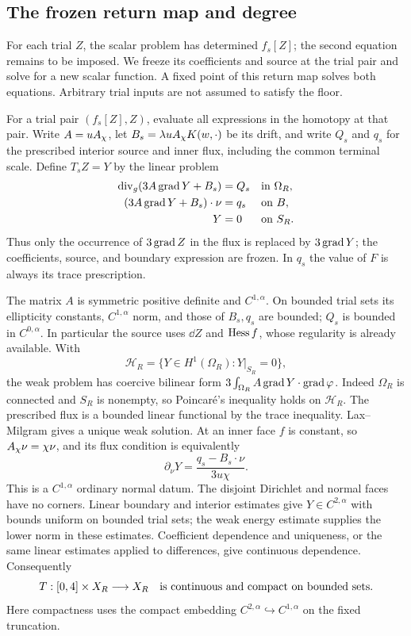 \subsection{The frozen return map and degree}

For each trial $Z$, the scalar problem has determined $f_s[Z]$;
the second equation remains to be imposed. We freeze its
coefficients and source at the trial pair and solve for a new
scalar function. A fixed point of this return map solves both
equations. Arbitrary trial inputs are not assumed to satisfy the floor.

For a trial pair $(f_s[Z],Z)$, evaluate all expressions in the
homotopy at that pair.  Write $A=uA_\chi$, let
$B_s=\lambda uA_\chi K(w,\cdot)$ be its drift, and write $Q_s$ and $q_s$
for the prescribed interior source and inner flux, including the
common terminal scale.  Define $T_sZ=Y$ by the linear problem
\begin{equation}\label{four:ex:frozen-problem}
 \begin{aligned}
 \operatorname{div}_g(3A\operatorname{grad} Y+B_s)&=Q_s &&\hbox{in }\Omega_R,\\
 (3A\operatorname{grad} Y+B_s)\cdot\nu&=q_s &&\hbox{on }B,\\
 Y&=0 &&\hbox{on }S_R.
 \end{aligned}
\end{equation}
Thus only the occurrence of $3\operatorname{grad} Z$ in the flux is replaced by
$3\operatorname{grad} Y$; the coefficients, source, and boundary expression are
frozen.  In $q_s$ the value of $F$ is always its trace prescription.

The matrix $A$ is symmetric positive definite and $C^{1,\alpha}$.
On bounded trial sets its ellipticity constants, $C^{1,\alpha}$ norm,
and those of $B_s,q_s$ are bounded; $Q_s$ is bounded in $C^{0,\alpha}$.
In particular the source uses $\dd Z$ and $\operatorname{Hess} f$, whose regularity
is already available.  With
\[
 \mathcal H_R=\{Y\in H^1(\Omega_R):Y|_{S_R}=0\},
\]
the weak problem has coercive bilinear form
$3\int_{\Omega_R} A\operatorname{grad} Y\cdot\operatorname{grad}\varphi$.
Indeed $\Omega_R$ is connected and $S_R$ is nonempty, so Poincar\'e's
inequality holds on $\mathcal H_R$.  The prescribed flux is a bounded
linear functional by the trace inequality.  Lax--Milgram gives a unique
weak solution.  At an inner face $f$ is constant, so
$A_\chi\nu=\chi\nu$, and its flux condition is equivalently
\[
 \partial_\nu Y=\frac{q_s-B_s\cdot\nu}{3u\chi}.
\]
This is a $C^{1,\alpha}$ ordinary normal datum.  The disjoint Dirichlet
and normal faces have no corners.  Linear boundary and interior
estimates give $Y\in C^{2,\alpha}$ with bounds uniform on bounded
trial sets; the weak energy estimate supplies the lower norm in these
estimates.  Coefficient dependence and uniqueness, or the same linear
estimates applied to differences, give continuous dependence.
Consequently
\begin{equation}\label{four:ex:compact-map}
 T:[0,4]\times X_R\longrightarrow X_R
 \quad\hbox{is continuous and compact on bounded sets}.
\end{equation}
Here compactness uses the compact embedding
$C^{2,\alpha}\hookrightarrow C^{1,\alpha}$ on the fixed truncation.

